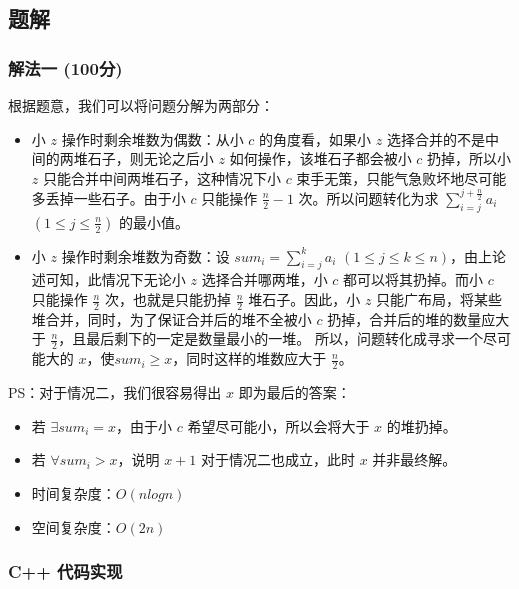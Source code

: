 \documentclass[UTF8, 12pt, a4paper, oneside]{ctexart}
\begin{document}
\subsection{题解}
\subsubsection{解法一 (100分)}
\par 根据题意，我们可以将问题分解为两部分：
\begin{itemize}
    \item 小 $z$ 操作时剩余堆数为偶数：从小 $c$ 的角度看，如果小 $z$ 选择合并的不是中间的两堆石子，则无论之后小 $z$ 如何操作，该堆石子都会被小 $c$ 扔掉，所以小 $z$ 只能合并中间两堆石子，这种情况下小 $c$ 束手无策，只能气急败坏地尽可能多丢掉一些石子。由于小 $c$ 只能操作 $\frac{n}{2} - 1$ 次。所以问题转化为求 $\sum_{i = j}^{j + \frac{n}{2}}a_i$ $(1 \leq j \leq \frac{n}{2})$ 的最小值。
    \item 小 $z$ 操作时剩余堆数为奇数：设 $sum_i = \sum_{i = j}^{k}a_i$ $(1 \leq j \leq k \leq n)$，由上论述可知，此情况下无论小 $z$ 选择合并哪两堆，小 $c$ 都可以将其扔掉。而小 $c$ 只能操作 $\frac{n}{2}$ 次，也就是只能扔掉 $\frac{n}{2}$ 堆石子。因此，小 $z$ 只能广布局，将某些堆合并，同时，为了保证合并后的堆不全被小 $c$ 扔掉，合并后的堆的数量应大于 $\frac{n}{2}$，且最后剩下的一定是数量最小的一堆。 所以，问题转化成寻求一个尽可能大的 $x$，使$sum_i \geq x$，同时这样的堆数应大于 $\frac{n}{2}$。
\end{itemize}
\par PS：对于情况二，我们很容易得出 $x$ 即为最后的答案：
\begin{itemize}
    \item 若 $\exists sum_i = x$，由于小 $c$ 希望尽可能小，所以会将大于 $x$ 的堆扔掉。
    \item 若 $\forall sum_i > x$，说明 $x+1$ 对于情况二也成立，此时 $x$ 并非最终解。
\end{itemize}
\begin{itemize}
    \item 时间复杂度：$O(nlogn)$
    \item 空间复杂度：$O(2n)$
\end{itemize}
\subsubsection{C++ 代码实现}

\end{document}
